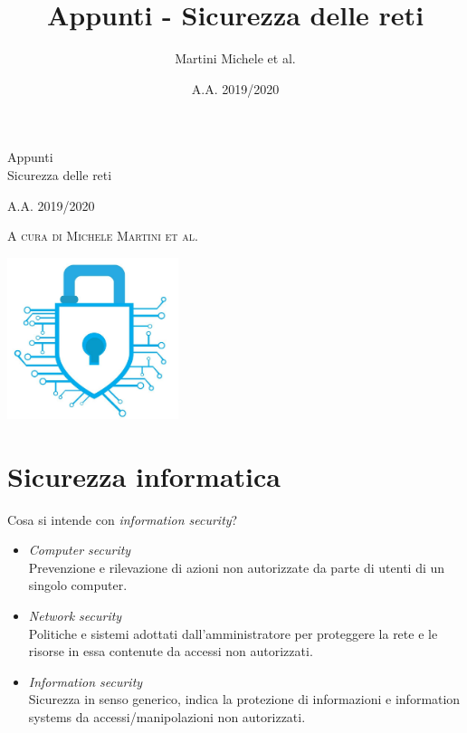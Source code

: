 \documentclass[a4paper, 11pt, twoside, openright, fleqn]{report}
\title{Appunti - Sicurezza delle reti}
\author{Martini Michele {\footnotesize et al.}}
\date{A.A. 2019/2020}
\begin{document}
\begin{titlepage}
	\begin{adjustwidth}{0cm}{-1.8cm}
	\thispagestyle{empty}
	\centering
	{\huge 
		Appunti\\{\Huge Sicurezza delle reti}\par}
	\vspace{4\baselineskip}
	A.A. 2019/2020\par
	{\textsc{\footnotesize A cura di {\normalsize Michele Martini} et al.}\par}
	\vfil
	\includegraphics[width=5cm]{images/logo}
		\end{adjustwidth}
\end{titlepage}

\setcounter{tocdepth}{1}
\tableofcontents

\chapter{Sicurezza informatica}
Cosa si intende con \emph{information security}?
\begin{itemize}
	\item \emph{Computer security}\\
	Prevenzione e rilevazione di azioni non autorizzate da parte di utenti di un singolo computer.
	\item \emph{Network security}\\
	Politiche e sistemi adottati dall'amministratore per proteggere la rete e le risorse in essa contenute da accessi non autorizzati.
	\item \emph{Information security}\\
	Sicurezza in senso generico, indica la protezione di informazioni e information systems da accessi/manipolazioni non autorizzati.
\end{itemize}
\end{document}
